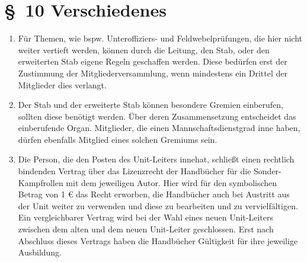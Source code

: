 \section*{\S~10 Verschiedenes}
\label{sec:verschiedenes}

\begin{enumerate}[label=(\arabic*)]
    \item Für Themen, wie bspw. Unteroffiziers- und Feldwebelprüfungen, die hier nicht weiter vertieft werden, können durch die Leitung, den Stab, oder den erweiterten Stab eigene Regeln geschaffen werden. Diese bedürfen erst der Zustimmung der Mitgliederversammlung, wenn mindestens ein Drittel der Mitglieder dies verlangt.
    \item Der Stab und der erweiterte Stab können besondere Gremien einberufen, sollten diese benötigt werden. Über deren Zusammensetzung entscheidet das einberufende Organ. Mitglieder, die einen Mannschaftsdienstgrad inne haben, dürfen ebenfalls Mitglied eines solchen Gremiums sein.
    \item Die Person, die den Posten des Unit-Leiters innehat, schließt einen rechtlich bindenden Vertrag über das Lizenzrecht der Handbücher für die Sonder-Kampfrollen mit dem jeweiligen Autor. Hier wird für den symbolischen Betrag von 1 € das Recht erworben, die Handbücher auch bei Austritt aus der Unit weiter zu verwenden und diese zu bearbeiten und zu vervielfältigen. Ein vergleichbarer Vertrag wird bei der Wahl eines neuen Unit-Leiters zwischen dem alten und dem neuen Unit-Leiter geschlossen. Erst nach Abschluss dieses Vertrags haben die Handbücher Gültigkeit für ihre jeweilige Ausbildung.
\end{enumerate}